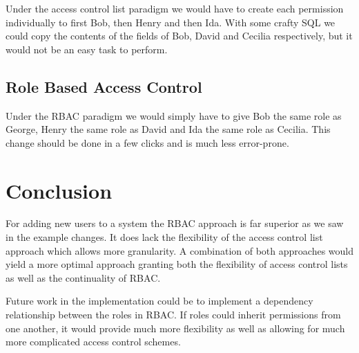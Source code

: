 \documentclass[12pt]{article}
\begin{document}
Under the access control list paradigm we would have to create each permission individually to first Bob, then Henry and then Ida. With some crafty SQL we could copy the contents of the fields of Bob, David and Cecilia respectively, but it would not be an easy task to perform.

\subsection{Role Based Access Control}
\label{sub:Role Based Access Control}

Under the RBAC paradigm we would simply have to give Bob the same role as George, Henry the same role as David and Ida the same role as Cecilia. This change should be done in a few clicks and is much less error-prone.

\newpage

\section{Conclusion}
\label{sec:Conclusion}

For adding new users to a system the RBAC approach is far superior as we saw in the example changes. It does lack the flexibility of the access control list approach which allows more granularity. A combination of both approaches would yield a more optimal approach granting both the flexibility of access control lists as well as the continuality of RBAC.

Future work in the implementation could be to implement a dependency relationship between the roles in RBAC. If roles could inherit permissions from one another, it would provide much more flexibility as well as allowing for much more complicated access control schemes.  
\end{document}
